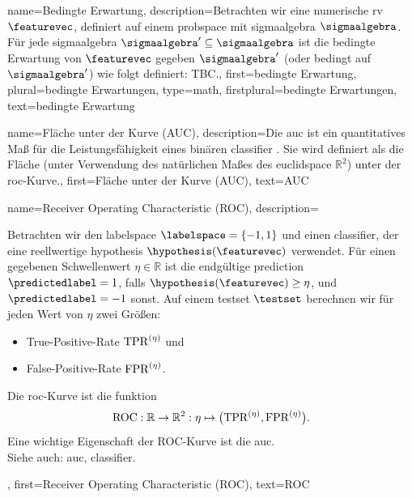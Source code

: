 {{{{
{
    name={Bedingte Erwartung}, 
    description={Betrachten wir eine numerische \gls{rv} $\featurevec$, definiert auf einem 
        \gls{probspace} mit \gls{sigmaalgebra} $\sigmaalgebra$. Für jede \gls{sigmaalgebra} 
        $\sigmaalgebra' \subseteq \sigmaalgebra$ ist die bedingte Erwartung von $\featurevec$ 
        gegeben $\sigmaalgebra'$ (oder bedingt auf $\sigmaalgebra'$) wie folgt definiert: TBC.}, 
    first={bedingte Erwartung},
    plural={bedingte Erwartungen}, 
    type=math, 
    firstplural={bedingte Erwartungen},  
    text={bedingte Erwartung}
}

{
    name={Fläche unter der Kurve (AUC)}, 
    description={Die \gls{auc} ist ein quantitatives Maß für die 
        Leistungsfähigkeit eines binären \gls{classifier} \cite{Hanley:1982aa}. Sie wird definiert als die Fläche 
        (unter Verwendung des natürlichen Maßes des \gls{euclidspace} $\mathbb{R}^{2}$) unter der \gls{roc}-Kurve.}, 
    first={Fläche unter der Kurve (AUC)}, 
    text={AUC} 
}

{
    name={Receiver Operating Characteristic (ROC)}, 
    description={Betrachten wir den \gls{labelspace} $\labelspace=\{-1,1\}$ und einen \gls{classifier}, 
        der eine reellwertige \gls{hypothesis} $\hypothesis(\featurevec)$ verwendet. Für einen gegebenen 
        Schwellenwert $\eta \in \mathbb{R}$ ist die endgültige \gls{prediction} $\predictedlabel=1$, 
        falls $\hypothesis(\featurevec)\geq \eta$, und $\predictedlabel=-1$ sonst. 
        Auf einem \gls{testset} $\testset$ berechnen wir für jeden Wert von $\eta$ zwei Größen: 
        \begin{itemize} 
            \item True-Positive-Rate ${\rm TPR}^{(\eta)}$ und 
            \item False-Positive-Rate ${\rm FPR}^{(\eta)}$. 
        \end{itemize}  
        Die \gls{roc}-Kurve ist die \gls{funktion} \cite{IntroROCFawcett}
        $${\rm ROC}: \mathbb{R} \rightarrow \mathbb{R}^{2}: \eta \mapsto \big({\rm TPR}^{(\eta)}, {\rm FPR}^{(\eta)} \big).$$ 
        Eine wichtige Eigenschaft der ROC-Kurve ist die \gls{auc}.\\ 
        Siehe auch: \gls{auc}, \gls{classifier}.}, 
    first={Receiver Operating Characteristic (ROC)}, 
    text={ROC}
}

}}}}
